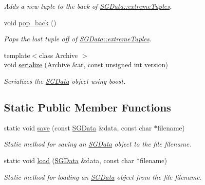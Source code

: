 \begin{DoxyCompactItemize}
\begin{DoxyCompactList}\small\item\em Adds a new tuple to the back of \hyperlink{classSGData_a197411a0804166fa2573a1de83046b49}{S\-G\-Data\-::extreme\-Tuples}. \end{DoxyCompactList}\item 
\hypertarget{classSGData_aea26fef4cbbb2a706cfb0c871fb804a5}{void \hyperlink{classSGData_aea26fef4cbbb2a706cfb0c871fb804a5}{pop\-\_\-back} ()}\label{classSGData_aea26fef4cbbb2a706cfb0c871fb804a5}

\begin{DoxyCompactList}\small\item\em Pops the last tuple off of \hyperlink{classSGData_a197411a0804166fa2573a1de83046b49}{S\-G\-Data\-::extreme\-Tuples}. \end{DoxyCompactList}\item 
\hypertarget{classSGData_a4aa12a968f317f0b89f54d65af1e86ab}{{\footnotesize template$<$class Archive $>$ }\\void \hyperlink{classSGData_a4aa12a968f317f0b89f54d65af1e86ab}{serialize} (Archive \&ar, const unsigned int version)}\label{classSGData_a4aa12a968f317f0b89f54d65af1e86ab}

\begin{DoxyCompactList}\small\item\em Serializes the \hyperlink{classSGData}{S\-G\-Data} object using boost. \end{DoxyCompactList}\end{DoxyCompactItemize}
\subsection*{Static Public Member Functions}
\begin{DoxyCompactItemize}
\item 
\hypertarget{classSGData_a01f1e49d025ffed33549ef26b05a1d8a}{static void \hyperlink{classSGData_a01f1e49d025ffed33549ef26b05a1d8a}{save} (const \hyperlink{classSGData}{S\-G\-Data} \&data, const char $\ast$filename)}\label{classSGData_a01f1e49d025ffed33549ef26b05a1d8a}

\begin{DoxyCompactList}\small\item\em Static method for saving an \hyperlink{classSGData}{S\-G\-Data} object to the file filename. \end{DoxyCompactList}\item 
\hypertarget{classSGData_adf23a971f4e96fd72a54fbc6688b2b04}{static void \hyperlink{classSGData_adf23a971f4e96fd72a54fbc6688b2b04}{load} (\hyperlink{classSGData}{S\-G\-Data} \&data, const char $\ast$filename)}\label{classSGData_adf23a971f4e96fd72a54fbc6688b2b04}

\begin{DoxyCompactList}\small\item\em Static method for loading an \hyperlink{classSGData}{S\-G\-Data} object from the file filename. \end{DoxyCompactList}\end{DoxyCompactItemize}
